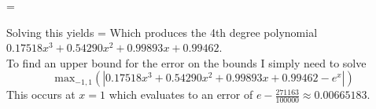 \documentclass[10pt]{jhwhw}
\begin{document}
	\bigbreak
	\left[\begin{array}{c}
		a \\ b \\ c \\ d \\
	\end{array} \right] =
	\left[\begin{array}{c}
		2.51904 \\ 1.46621 \\ 0.68203 \\ 0.39696 \\
	\end{array} \right]

	\bigbreak
	Solving this yields
	\bigbreak
	\left[\begin{array}{c}
		a \\ b \\ c \\ d \\
	\end{array} \right] =
	\left[\begin{array}{c}
		0.17518 \\ 0.54290 \\ 0.99893 \\ 0.99462 \\
	\end{array} \right] \bigbreak
	Which produces the 4th degree polynomial $0.17518x^3 + 0.54290x^2 + 0.99893x + 0.99462$. \\
	To find an upper bound for the error on the bounds I simply need to solve
	$$
		\text{max}_{-1,1}(|0.17518x^3 + 0.54290x^2 + 0.99893x + 0.99462 - e^x|)
	$$
	This occurs at $x=1$ which evaluates to an error of $e - \frac{271163}{100000} \approx 0.00665183$.
\end{document}
